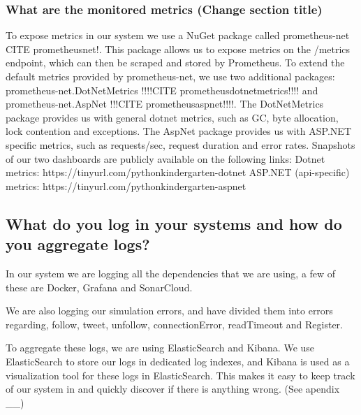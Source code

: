 \subsubsection{What are the monitored metrics (Change section title)}
To expose metrics in our system we use a NuGet package called prometheus-net CITE prometheusnet!.
This package allows us to expose metrics on the /metrics endpoint, which can then be scraped and stored by Prometheus.
\newline
To extend the default metrics provided by prometheus-net, we use two additional packages: 
prometheus-net.DotNetMetrics !!!!CITE prometheusdotnetmetrics!!!! and prometheus-net.AspNet !!!CITE prometheusaspnet!!!!.
\newline
The DotNetMetrics package provides us with general dotnet metrics, such as GC, byte allocation, lock contention and exceptions.
\newline
The AspNet package provides us with ASP.NET specific metrics, such as requests/sec, request duration and error rates.
\newline
\newline
Snapshots of our two dashboards are publicly available on the following links:
\newline
Dotnet metrics: https://tinyurl.com/pythonkindergarten-dotnet
\newline
ASP.NET (api-specific) metrics: https://tinyurl.com/pythonkindergarten-aspnet

\subsection{What do you log in your systems and how do you aggregate logs?}
In our system we are logging all the dependencies that we are using, a few of these are Docker, Grafana and SonarCloud. 

We are also logging our simulation errors, and have divided them into errors regarding, follow, tweet, unfollow, connectionError, readTimeout and Register.

To aggregate these logs, we are using ElasticSearch and Kibana. We use ElasticSearch to store our logs in dedicated log indexes, and Kibana is used as a visualization tool for these logs in ElasticSearch. This makes it easy to keep track of our system in and quickly discover if there is anything wrong. (See apendix __) \newline

